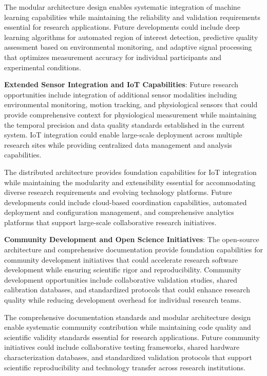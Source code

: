 \documentclass[12pt,a4paper]{report}
\begin{document}
The modular architecture design enables systematic integration of machine learning capabilities while maintaining the
reliability and validation requirements essential for research applications. Future developments could include deep
learning algorithms for automated region of interest detection, predictive quality assessment based on environmental
monitoring, and adaptive signal processing that optimizes measurement accuracy for individual participants and
experimental conditions.

\textbf{Extended Sensor Integration and IoT Capabilities}: Future research opportunities include integration of additional
sensor modalities including environmental monitoring, motion tracking, and physiological sensors that could provide
comprehensive context for physiological measurement while maintaining the temporal precision and data quality standards
established in the current system. IoT integration could enable large-scale deployment across multiple research sites
while providing centralized data management and analysis capabilities.

The distributed architecture provides foundation capabilities for IoT integration while maintaining the modularity and
extensibility essential for accommodating diverse research requirements and evolving technology platforms. Future
developments could include cloud-based coordination capabilities, automated deployment and configuration management, and
comprehensive analytics platforms that support large-scale collaborative research initiatives.

\textbf{Community Development and Open Science Initiatives}: The open-source architecture and comprehensive documentation
provide foundation capabilities for community development initiatives that could accelerate research software
development while ensuring scientific rigor and reproducibility. Community development opportunities include
collaborative validation studies, shared calibration databases, and standardized protocols that could enhance research
quality while reducing development overhead for individual research teams.

The comprehensive documentation standards and modular architecture design enable systematic community contribution while
maintaining code quality and scientific validity standards essential for research applications. Future community
initiatives could include collaborative testing frameworks, shared hardware characterization databases, and standardized
validation protocols that support scientific reproducibility and technology transfer across research institutions.
\end{document}
